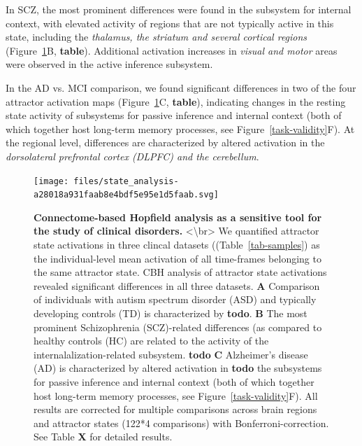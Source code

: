 \documentclass{article}
\begin{document}
In SCZ, the most prominent differences were found in the subsystem for internal context, with elevated activity of
regions that are not typically active in this state, including the \textit{thalamus, the striatum and several cortical regions}
(Figure~\ref{clinical-validity}B, \textbf{table}). Additional activation increases in \textit{visual and motor} areas were observed in
the active inference subsystem.

In the AD vs. MCI comparison, we found significant differences in two of the four attractor activation maps
(Figure~\ref{clinical-validity}C, \textbf{table}), indicating changes in the resting state activity of subsystems for passive
inference and internal context (both of which together host long-term memory processes, see Figure~\ref{task-validity}F).
At the regional level, differences are characterized by altered activation in the \textit{dorsolateral prefrontal cortex
(DLPFC) and the cerebellum}.

\begin{figure}[!htbp]
\centering
\texttt{[image: files/state\_analysis-a28018a931faab8e4bdf5e95e1d5faab.svg]}
\caption[]{\textbf{Connectome-based Hopfield analysis as a sensitive tool for the study of clinical disorders.} \newline
\textless {\textbackslash}br\textgreater 
We quantified attractor state activations in three clincal datasets ((Table~\ref{tab-samples}) as the
individual-level mean activation of all time-frames belonging to the same attractor state. CBH analysis of attractor
state activations revealed significant differences in all three datasets.
\textbf{A} Comparison of individuals with autism spectrum disorder (ASD) and typically developing controls (TD) is
characterized by \textbf{todo}.
\textbf{B} The most prominent Schizophrenia (SCZ)-related differences (as compared to healthy controls (HC) are related to
the activity of the internalalization-related subsystem. \textbf{todo}
\textbf{C} Alzheimer's disease (AD) is characterized by altered activation in \textbf{todo} the subsystems for passive inference
and internal context (both of which together host long-term memory processes, see Figure~\ref{task-validity}F). All
results are corrected for multiple comparisons across brain regions and attractor states (122*4 comparisons)
with Bonferroni-correction. See Table \textbf{X} for detailed results.}
\label{clinical-validity}
\end{figure}
\end{document}
